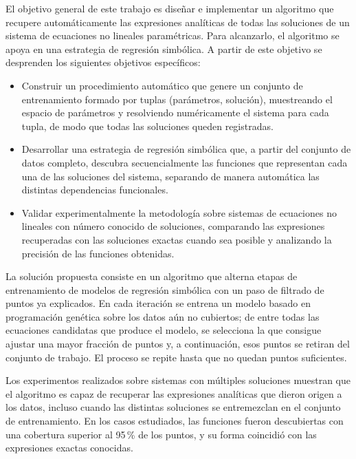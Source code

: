 \documentclass[12pt,a4paper]{article} \usepackage[utf8]{inputenc} \usepackage[spanish]{babel} \usepackage{amsmath, amssymb, amsthm} \usepackage{bm} \usepackage{float} \usepackage{longtable} \usepackage[hidelinks]{hyperref}
\begin{document}
El objetivo general de este trabajo es diseñar e implementar un
algoritmo que recupere automáticamente las expresiones analíticas de
todas las soluciones de un sistema de ecuaciones no lineales
paramétricas.  Para alcanzarlo, el algoritmo se apoya en una estrategia
de regresión simbólica.  A partir de este objetivo se desprenden los
siguientes objetivos específicos:

\begin{itemize}
\item Construir un procedimiento automático que genere un conjunto de
      entrenamiento formado por tuplas (parámetros, solución),
      muestreando el espacio de parámetros y resolviendo numéricamente
      el sistema para cada tupla, de modo que todas las soluciones
      queden registradas.

\item Desarrollar una estrategia de regresión simbólica que, a partir
      del conjunto de datos completo, descubra secuencialmente las
      funciones que representan cada una de las soluciones del sistema,
      separando de manera automática las distintas dependencias
      funcionales.

\item Validar experimentalmente la metodología sobre sistemas de
      ecuaciones no lineales con número conocido de soluciones,
      comparando las expresiones recuperadas con las soluciones exactas
      cuando sea posible y analizando la precisión de las funciones
      obtenidas.
\end{itemize}

La solución propuesta consiste en un algoritmo que alterna etapas de
entrenamiento de modelos de regresión simbólica con un paso de filtrado
de puntos ya explicados.  En cada iteración se entrena un modelo basado
en programación genética sobre los datos aún no cubiertos; de entre
todas las ecuaciones candidatas que produce el modelo, se selecciona la
que consigue ajustar una mayor fracción de puntos y, a continuación,
esos puntos se retiran del conjunto de trabajo.  El proceso se repite
hasta que no quedan puntos suficientes.

Los experimentos realizados sobre sistemas con múltiples soluciones
muestran que el algoritmo es capaz de recuperar las expresiones
analíticas que dieron origen a los datos, incluso cuando las distintas
soluciones se entremezclan en el conjunto de entrenamiento.  En los
casos estudiados, las funciones fueron descubiertas con una cobertura
superior al 95\,\% de los puntos, y su forma coincidió con las
expresiones exactas conocidas.
\end{document}
